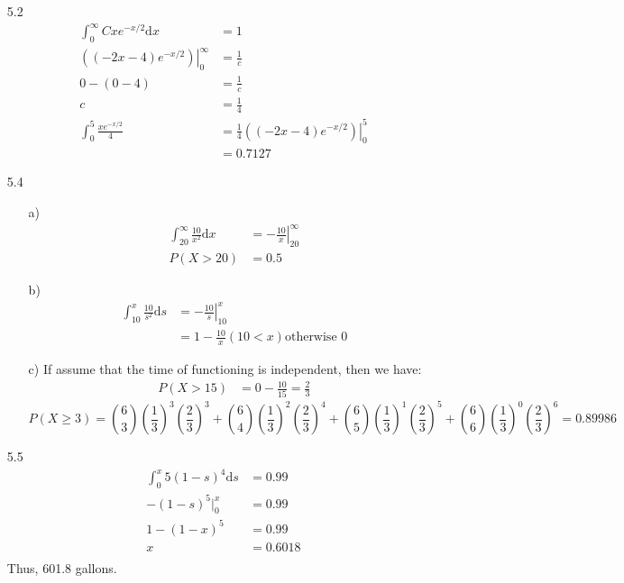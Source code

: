 \documentclass{article}
\begin{document}
\begin{itemize}
    \item [5.2]
    \begin{align*}
        \int_0^{\infty} Cxe^{-x/2}\text{d}x&=1\\
        \left.\left((-2x-4)e^{-x/2}\right)\right|^\infty_0&=\frac{1}{c}\\
        0-(0-4) &= \frac{1}{c}\\
        c&= \frac{1}{4}\\
        \int_{0}^{5}\frac{xe^{-x/2}}{4}&=\frac{1}{4}\left.\left((-2x-4)e^{-x/2}\right)\right|^5_0\\
        &=0.7127
    \end{align*}
    \item [5.4]
    \begin{itemize}
        \item [a)]
        \begin{align*}
            \int_{20}^{\infty}\frac{10}{x^2}\text{d}x&=\left.-\frac{10}{x}\right|^{\infty}_{20}\\
            P(X>20)&=0.5
        \end{align*}
        \item [b)]
        \begin{align*}
            \int_{10}^{x}\frac{10}{s^2}\text{d}s&=\left.-\frac{10}{s}\right|^{x}_{10}\\
            &=1-\frac{10}{x} (10<x) \text{otherwise 0}
        \end{align*}
        \item [c)]If assume that the time of functioning is independent, then we have:
        \begin{align*}
            P(X>15) & = 0-\frac{10}{15} = \frac{2}{3}
        \end{align*}
        \[P(X\geq3) = \binom{6}{3}(\frac{1}{3})^3(\frac{2}{3})^3+\binom{6}{4}(\frac{1}{3})^2(\frac{2}{3})^4+\binom{6}{5}(\frac{1}{3})^1(\frac{2}{3})^5+\binom{6}{6}(\frac{1}{3})^0(\frac{2}{3})^6=0.89986\]
    \end{itemize}
    \item [5.5]
    \begin{align*}
        \int_{0}^{x}5(1-s)^4\text{d}s &= 0.99\\
        -(1-s)^5|^x_0&=0.99\\
        1-(1-x)^5&=0.99\\
        x&=0.6018\\
    \end{align*}
    Thus, 601.8 gallons.
\end{itemize}
\end{document}
